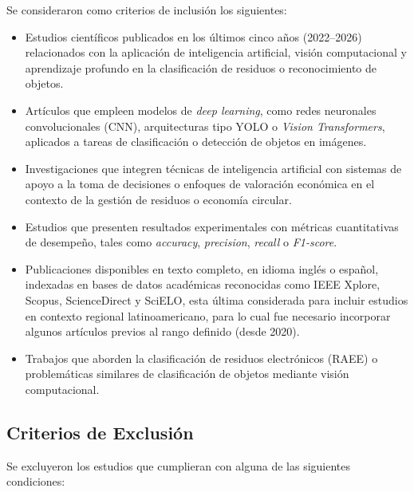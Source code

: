 Se consideraron como criterios de inclusión los siguientes:

\begin{itemize}
    \item Estudios científicos publicados en los últimos cinco años (2022--2026) relacionados con la aplicación de inteligencia artificial, visión computacional y aprendizaje profundo en la clasificación de residuos o reconocimiento de objetos.

    \item Artículos que empleen modelos de \textit{deep learning}, como redes neuronales convolucionales (CNN), arquitecturas tipo YOLO o \textit{Vision Transformers}, aplicados a tareas de clasificación o detección de objetos en imágenes.

    \item Investigaciones que integren técnicas de inteligencia artificial con sistemas de apoyo a la toma de decisiones o enfoques de valoración económica en el contexto de la gestión de residuos o economía circular.

    \item Estudios que presenten resultados experimentales con métricas cuantitativas de desempeño, tales como \textit{accuracy}, \textit{precision}, \textit{recall} o \textit{F1-score}.

    \item Publicaciones disponibles en texto completo, en idioma inglés o español, indexadas en bases de datos académicas reconocidas como IEEE Xplore, Scopus, ScienceDirect y SciELO, esta última considerada para incluir estudios en contexto regional latinoamericano, para lo cual fue necesario incorporar algunos artículos previos al rango definido (desde 2020).

    \item Trabajos que aborden la clasificación de residuos electrónicos (RAEE) o problemáticas similares de clasificación de objetos mediante visión computacional.
\end{itemize}

\subsection{Criterios de Exclusión}

Se excluyeron los estudios que cumplieran con alguna de las siguientes condiciones:

